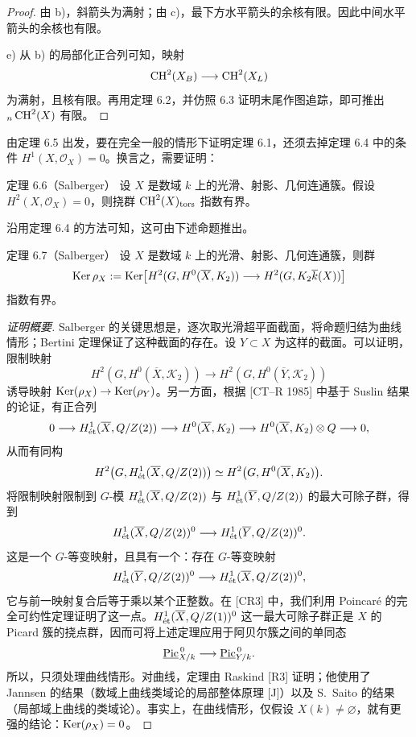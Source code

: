 \begin{proof}
由 b)，斜箭头为满射；由 c)，最下方水平箭头的余核有限。因此中间水平箭头的余核也有限。

e) 从 b) 的局部化正合列可知，映射
\[
 \operatorname{CH}^2(X_B)\longrightarrow\operatorname{CH}^2(X_L)
\]
为满射，且核有限。再用定理 6.2，并仿照 6.3 证明末尾作图追踪，即可推出 ${}_n\operatorname{CH}^2(X)$ 有限。
\end{proof}

由定理 6.5 出发，要在完全一般的情形下证明定理 6.1，还须去掉定理 6.4 中的条件 $H^1(X,\mathcal O_X)=0$。换言之，需要证明：

\begin{statement}{定理 6.6（Salberger）}
设 $X$ 是数域 $k$ 上的光滑、射影、几何连通簇。假设 $H^2(X,\mathcal O_X)=0$，则挠群 $\operatorname{CH}^2(X)_{\mathrm{tors}}$ 指数有界。
\end{statement}
沿用定理 6.4 的方法可知，这可由下述命题推出。
\begin{statement}{定理 6.7（Salberger）}
设 $X$ 是数域 $k$ 上的光滑、射影、几何连通簇，则群
\[
 \operatorname{Ker}\rho_X:=\operatorname{Ker}\bigl[H^2(G,H^0(\overline X,K_2))
 \longrightarrow H^2(G,K_2\overline k(X))\bigr]
\]
指数有界。
\end{statement}
\begin{proof}[证明概要]
Salberger 的关键思想是，逐次取光滑超平面截面，将命题归结为曲线情形；Bertini 定理保证了这种截面的存在。设 $Y\subset X$ 为这样的截面。可以证明，限制映射
\[
 H^2(G,H^0(\overline X,\mathcal K_2))
 \longrightarrow H^2(G,H^0(\overline Y,\mathcal K_2))
\]
诱导映射 $\operatorname{Ker}(\rho_X)\to\operatorname{Ker}(\rho_Y)$。另一方面，根据 [CT--R 1985] 中基于 Suslin 结果的论证，有正合列
\[
 0\longrightarrow H^1_{\mathrm{\acute et}}(\overline X,Q/Z(2))
 \longrightarrow H^0(\overline X,K_2)
 \longrightarrow H^0(\overline X,K_2)\otimes Q
 \longrightarrow0,
\]
从而有同构
\[
 H^2\bigl(G,H^1_{\mathrm{\acute et}}(\overline X,Q/Z(2))\bigr)
 \simeq H^2\bigl(G,H^0(\overline X,K_2)\bigr).
\]
将限制映射限制到 $G$-模 $H^1_{\mathrm{\acute et}}(\overline X,Q/Z(2))$ 与 $H^1_{\mathrm{\acute et}}(\overline Y,Q/Z(2))$ 的最大可除子群，得到
\[
 H^1_{\mathrm{\acute et}}(\overline X,Q/Z(2))^0
 \longrightarrow H^1_{\mathrm{\acute et}}(\overline Y,Q/Z(2))^0.
\]
这是一个 $G$-等变映射，且具有一个：存在 $G$-等变映射
\[
 H^1_{\mathrm{\acute et}}(\overline Y,Q/Z(2))^0
 \longrightarrow H^1_{\mathrm{\acute et}}(\overline X,Q/Z(2))^0,
\]
它与前一映射复合后等于乘以某个正整数。在 [CR3] 中，我们利用 Poincaré 的完全可约性定理证明了这一点。$H^1_{\mathrm{\acute et}}(\overline X,Q/Z(1))^0$ 这一最大可除子群正是 $X$ 的 Picard 簇的挠点群，因而可将上述定理应用于阿贝尔簇之间的单同态
\[
 \underline{\operatorname{Pic}}^{\,0}_{X/k}\longrightarrow\underline{\operatorname{Pic}}^{\,0}_{Y/k}.
\]
所以，只须处理曲线情形。对曲线，定理由 Raskind [R3] 证明；他使用了 Jannsen 的结果（数域上曲线类域论的局部整体原理 [J]）以及 S.~Saito 的结果（局部域上曲线的类域论）。事实上，在曲线情形，仅假设 $X(k)\ne\varnothing$，就有更强的结论：$\operatorname{Ker}(\rho_X)=0$。
\end{proof}


